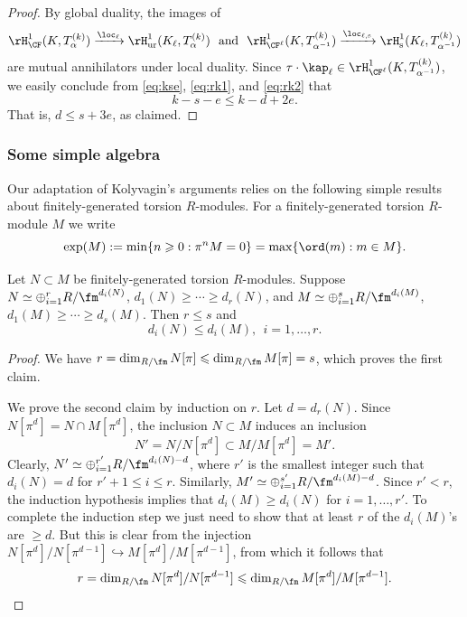 \begin{proof}
By global duality, the images of
$$
\rH^1_{\CF}(K,T_{\alpha}^{(k)}) \xrightarrow{\loc_\ell} \rH^1_{\rm ur}(K_\ell, T_{\alpha}^{(k)})
\ \ \text{and} \ \
\rH^1_{\CF^\ell}(K,T_{\alpha^{-1}}^{(k)}) \xrightarrow{\loc_{\ell,\rm{s}}} \rH^1_{\rm s}(K_\ell, T_{\alpha^{-1}}^{(k)})
$$
are mutual annihilators under local duality.
Since $\tau\cdot \kap_\ell \in \rH^1_{\CF^\ell}(K,T_{\alpha^{-1}}^{(k)})$, we easily conclude from \eqref{eq:kse}, \eqref{eq:rk1},
and \eqref{eq:rk2} that
$$
k-s-e \leqslant k-d+2e.
$$
That is, $d \leqslant s+3e$, as claimed.
\end{proof}


\subsubsection{Some simple algebra} Our adaptation of Kolyvagin's arguments
relies on the following simple results about finitely-generated torsion $R$-modules.
For a finitely-generated torsion $R$-module $M$ we write
\begin{displaymath}
\exp(M):=\min\{n\geqslant 0: \pi^n M=0\} = \max\{\ord(m) : m\in M\}.
\end{displaymath}

\begin{lemma}
\notready\label{lem:key0}
Let $N\subset M$ be finitely-generated torsion $R$-modules.
Suppose $N \simeq \oplus_{i=1}^r R/\fm^{d_i(N)}$, $d_1(N)\geqslant \cdots \geqslant d_r(N)$,
and $M\simeq\oplus_{i=1}^s R/\fm^{d_i(M)}$, $d_1(M)\geqslant \cdots \geqslant d_s(M)$.
Then $r\leqslant s$ and
\[
d_i(N) \leqslant d_i(M), \ \ i=1,\dots,r.
\]
\end{lemma}

\begin{proof}
We have $r = \dim_{R/\fm} N[\pi] \leqslant \dim_{R/\fm} M[\pi] = s$,
which proves the first claim.

We prove the second claim by induction on $r$.
Let $d = d_r(N)$. Since $N[\pi^d] = N \cap M[\pi^d]$, the inclusion $N\subset M$
induces an inclusion
$$
N' = N/N[\pi^d] \subset M/M[\pi^d] = M'.
$$
Clearly, $N' \simeq \oplus_{i=1}^{r'} R/\fm^{d_i(N)-d}$, where
$r'$ is the smallest integer such that $d_i(N) = d$ for $r'+1\leqslant i \leqslant r$.
Similarly, $M'\simeq \oplus_{i=1}^{s'} R/\fm^{d_i(M)-d}$.
Since $r'<r$, the induction hypothesis implies that
$d_i(M)\geqslant d_i(N)$ for $i=1,\dots,r'$.
To complete the induction step we just need to show that at least
$r$ of the $d_i(M)$'s are $\geqslant d$. But this is clear from the injection
$N[\pi^d]/N[\pi^{d-1}] \hookrightarrow  M[\pi^d]/M[\pi^{d-1}]$,
from which it follows that
$$
r = \dim_{R/\fm} N[\pi^d]/N[\pi^{d-1}] \leqslant \dim_{R/\fm} M[\pi^d]/M[\pi^{d-1}].
$$
\end{proof}



